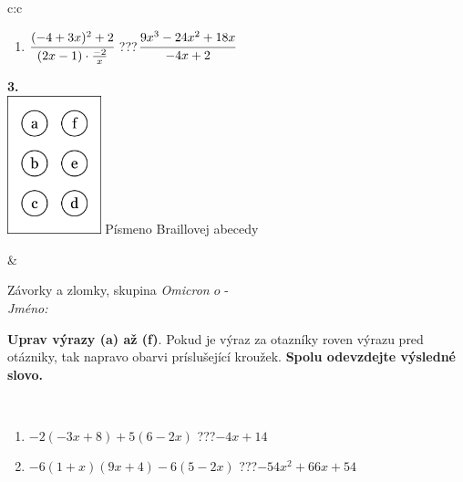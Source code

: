 \documentclass[10pt]{report}
\newcommand\omicron{o}
\begin{document}
\begin{tabular}{c:c}
\begin{minipage}[c][104.5mm][t]{0.5\linewidth}
\begin{center}
\begin{minipage}{0.79\linewidth}
\begin{center}
\begin{varwidth}{\linewidth}
\begin{enumerate}
\item $\cfrac{(-4+3x)^2+2}{(2x-1)\cdot\frac{-2}{x}}$\quad \dotfill\; ???\;\dotfill \quad $\cfrac{9x^3-24x^2+18x}{-4x+2}$
\end{enumerate}
\end{varwidth}
\end{center}
\end{minipage}
\begin{minipage}{0.20\linewidth}
\begin{center}
{\Huge\bfseries 3.} \\[2mm]
\includegraphics[height=40mm]{../images/braille.png}
{\small Písmeno Braillovej abecedy}
\end{center}
\end{minipage}
\end{center}
\end{minipage}
&
\begin{minipage}[c][104.5mm][t]{0.5\linewidth}
\begin{center}
\vspace{7mm}
{\huge Závorky a zlomky, skupina \textit{Omicron $\omicron$} -}\\[5mm]
\textit{Jméno:}\phantom{xxxxxxxxxxxxxxxxxxxxxxxxxxxxxxxxxxxxxxxxxxxxxxxxxxxxxxxxxxxxxxxxx}\\[5mm]
\begin{minipage}{0.95\linewidth}
\begin{center}
\textbf{Uprav výrazy (a) až (f)}. Pokud je výraz za otazníky roven výrazu pred otázniky, tak napravo obarvi príslušející kroužek. \textbf{Spolu odevzdejte výsledné slovo.}
\end{center}
\end{minipage}
\\[1mm]
\begin{minipage}{0.79\linewidth}
\begin{center}
\begin{varwidth}{\linewidth}
\begin{enumerate}
\normalsize
\item $-2(-3x+8)+5(6-2x)$\quad \dotfill\; ???\;\dotfill \quad $-4x+14$
\item $-6(1+x)(9x+4)-6(5-2x)$\quad \dotfill\; ???\;\dotfill \quad $-54x^2+66x+54$

\end{enumerate}
\end{varwidth}
\end{center}
\end{minipage}
\end{center}
\end{minipage}
\end{tabular}
\end{document}
